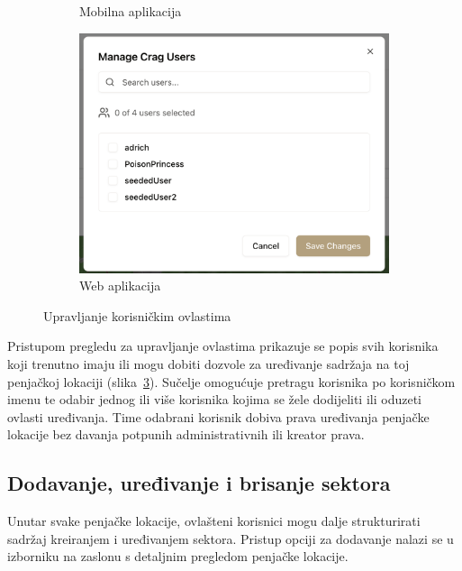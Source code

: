 \begin{figure}[H]
\begin{subfigure}[b]{0.36\textwidth}
        \caption{Mobilna aplikacija}
        \label{fig:upravljanje_ovlastima_mob}
    \end{subfigure}
    \hfill
    \begin{subfigure}[b]{0.6\textwidth}
        \centering
        \includegraphics[width=\textwidth]{images/implementacija/web/editing-options/manage-users.png}
        \caption{Web aplikacija}
        \label{fig:upravljanje_ovlastima_web}
    \end{subfigure}
    \caption{Upravljanje korisničkim ovlastima}
    \label{fig:upravljanje_ovlastima}
\end{figure}

Pristupom pregledu za upravljanje ovlastima prikazuje se popis svih korisnika koji trenutno imaju ili mogu dobiti dozvole za uređivanje sadržaja na toj penjačkoj lokaciji (slika~\ref{fig:upravljanje_ovlastima}). Sučelje omogućuje pretragu korisnika po korisničkom imenu te odabir jednog ili više korisnika kojima se žele dodijeliti ili oduzeti ovlasti uređivanja. Time odabrani korisnik dobiva prava uređivanja penjačke lokacije bez davanja potpunih administrativnih ili kreator prava.


\subsection{Dodavanje, uređivanje i brisanje sektora}

Unutar svake penjačke lokacije, ovlašteni korisnici mogu dalje strukturirati sadržaj kreiranjem i uređivanjem sektora. Pristup opciji za dodavanje nalazi se u izborniku na zaslonu s detaljnim pregledom penjačke lokacije. 

